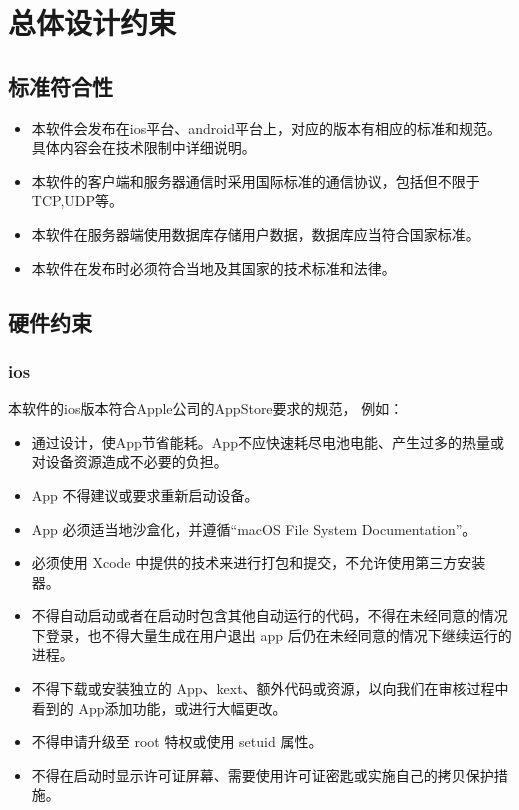 \chapter{总体设计约束}
\section{标准符合性}
\begin{itemize}
\item 本软件会发布在ios平台、android平台上，对应的版本有相应的标准和规范。具体内容会在技术限制中详细说明。
\item 本软件的客户端和服务器通信时采用国际标准的通信协议，包括但不限于TCP,UDP等。
\item 本软件在服务器端使用数据库存储用户数据，数据库应当符合国家标准。
\item 本软件在发布时必须符合当地及其国家的技术标准和法律。
\end{itemize}
\section{硬件约束}
\subsection{ios}
本软件的ios版本符合Apple公司的AppStore要求的规范，
例如：
\begin{itemize}
  \item 通过设计，使App节省能耗。App不应快速耗尽电池电能、产生过多的热量或对设备资源造成不必要的负担。
  \item App 不得建议或要求重新启动设备。
  \item App 必须适当地沙盒化，并遵循“macOS File System Documentation”。
  \item 必须使用 Xcode 中提供的技术来进行打包和提交，不允许使用第三方安装器。
  \item 不得自动启动或者在启动时包含其他自动运行的代码，不得在未经同意的情况下登录，也不得大量生成在用户退出 app 后仍在未经同意的情况下继续运行的进程。
  \item 不得下载或安装独立的 App、kext、额外代码或资源，以向我们在审核过程中看到的 App添加功能，或进行大幅更改。
  \item 不得申请升级至 root 特权或使用 setuid 属性。
  \item 不得在启动时显示许可证屏幕、需要使用许可证密匙或实施自己的拷贝保护措施。
\end{itemize}

